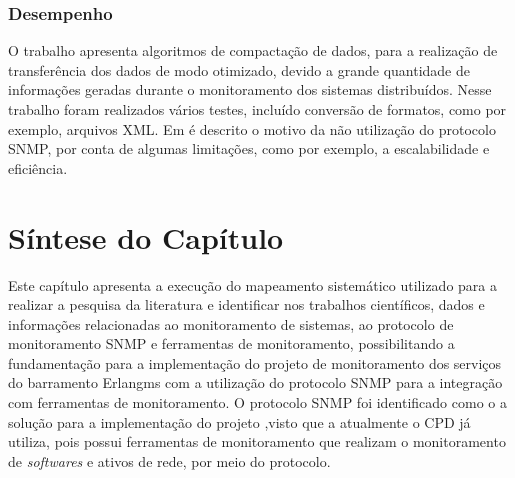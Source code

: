 \subsubsection{Desempenho}

O trabalho \cite{wang2016improvements} apresenta algoritmos de compactação de dados, para a realização de transferência dos dados de modo otimizado, devido a grande quantidade de informações geradas durante o monitoramento dos sistemas distribuídos. Nesse trabalho foram realizados vários testes, incluído conversão de formatos, como por exemplo, arquivos XML. Em \cite{kotsopoulos2008soa} é descrito o motivo da não utilização do protocolo SNMP, por conta de algumas limitações, como por exemplo, a escalabilidade e eficiência. 

\section{Síntese do Capítulo}

Este capítulo apresenta a execução do mapeamento sistemático utilizado para a realizar a pesquisa da literatura e identificar nos trabalhos científicos, dados e informações relacionadas ao monitoramento de sistemas, ao protocolo de monitoramento \acrshort{SNMP} e ferramentas de monitoramento, possibilitando a fundamentação para a implementação do projeto de monitoramento dos serviços do barramento Erlangms com a utilização do protocolo \acrshort{SNMP} para a integração com ferramentas de monitoramento. O protocolo \acrshort{SNMP} foi identificado como o a solução para a implementação do projeto ,visto que a atualmente o \acrshort{CPD} já utiliza, pois  possui ferramentas de monitoramento que realizam o monitoramento de \textit{softwares} e ativos de rede, por meio do protocolo. 

